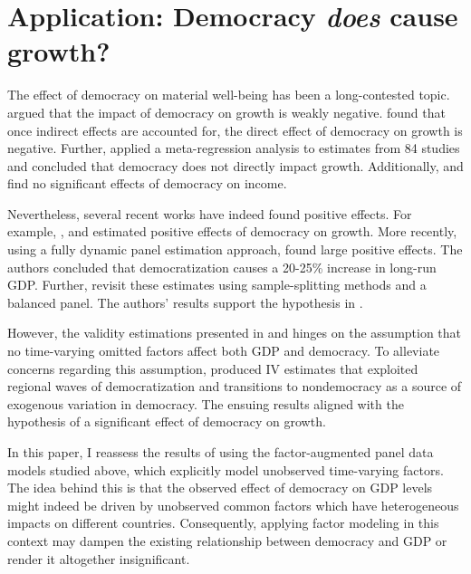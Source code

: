 \section{Application: Democracy \textit{does} cause growth?}\label{application}


The effect of democracy on material well-being has been a long-contested topic. \citet{barro1996democracy} argued that the impact of democracy on growth is weakly negative. \citet{tavares2001democracy} found that once indirect effects are accounted for, the direct effect of democracy on growth is negative. Further, \citet{doucouliagos2008democracy} applied a meta-regression analysis to estimates from 84 studies and concluded that democracy does not directly impact growth. Additionally, \citet{giavazzi2005economic} and \citet{murtin2014democratic} find no significant effects of democracy on income.  

Nevertheless, several recent works have indeed found positive effects. For example, \citet{rodrik2005democratic}, \citet{persson2006democracy} and \citet{papaioannou2008democratisation} estimated positive effects of democracy on growth.  More recently, using a  fully dynamic panel estimation approach, \citet{acemoglu2019democracy} found large positive effects. The authors concluded that democratization causes a 20-25\% increase in long-run GDP. Further, \citet{chen2019mastering} revisit these estimates using sample-splitting methods and a balanced panel. The authors' results support the hypothesis in \citet{acemoglu2019democracy}.

However, the validity estimations presented in \citet{acemoglu2019democracy} and \citet{chen2019mastering} hinges on the assumption that no time-varying omitted factors
affect both GDP and democracy. To alleviate concerns regarding this assumption, \citet{acemoglu2019democracy} produced IV estimates that exploited regional waves of democratization and transitions to nondemocracy as a source of exogenous variation in democracy. The ensuing results aligned with the hypothesis of a  significant effect of democracy on growth.


In this paper, I reassess the results of \cite{acemoglu2019democracy} using the factor-augmented panel data models studied above, which explicitly model unobserved time-varying factors. The idea behind this is that the observed effect of democracy on \ac{GDP} levels might indeed be driven by unobserved common factors which have heterogeneous impacts on different countries. Consequently, applying factor modeling in this context may dampen the existing relationship between democracy and \ac{GDP} or render it altogether insignificant. 

